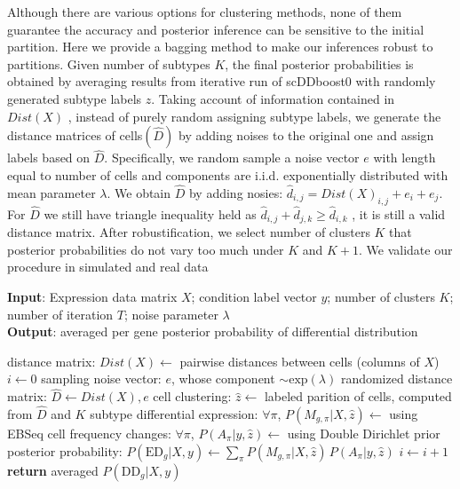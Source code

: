 \documentclass[11pt]{amsart}
\begin{document}
Although there are various options for clustering methods, none of them guarantee the accuracy and posterior inference can be sensitive to the initial partition. Here we provide a bagging method to make our inferences robust to partitions. Given number of subtypes $K$, the final posterior probabilities is obtained by averaging results from iterative run of scDDboost0 with randomly generated subtype labels $\hat z$. Taking account of information contained in $Dist(X)$ , instead of purely random assigning subtype labels, we generate the distance matrices of cells$(\hat D)$ by adding noises to the original one and assign labels based on $\hat D$. Specifically,  we random sample a noise vector $e$ with length equal to number of cells and components are i.i.d. exponentially distributed with mean parameter $\lambda$. We obtain $\hat{D}$ by adding nosies: $\hat{d}_{i,j} = Dist(X)_{i,j} + e_i  + e_j$. For $\hat{D}$ we still have triangle inequality held as $\hat{d}_{i,j} + \hat{d}_{j,k} \geq \hat{d}_{i,k}$ , it is still a valid distance matrix.
After robustification, we select number of clusters $K$ that posterior probabilities do not vary too much under $K$ and $K+1$.  We validate our procedure in simulated and real data


\begin{algorithm}
\caption{}\label{alg:scDDboost-robust}
\raggedright\hspace*{\algorithmicindent} \textbf{Input}: Expression data matrix $X$; condition label vector $y$; number of clusters $K$; number of iteration $T$; noise parameter $\lambda$   
\\
\hspace*{\algorithmicindent} \textbf{Output}: averaged per gene posterior probability of differential distribution 
\begin{algorithmic}[2]
\State distance matrix: $Dist(X) \gets$ pairwise distances between cells (columns of $X$)
\State $i \gets 0$
\State sampling noise vector: $e$, whose component $\sim \text{exp}(\lambda)$
\State randomized distance matrix: $\hat D \gets Dist(X), e$ 
\State cell clustering: $\hat z \gets$ labeled parition of cells, computed from $\hat D$ and $K$
\State subtype differential expression: $\forall \pi$,  $P(M_{g,\pi} | X, \hat z)\gets$ using EBSeq\cite{ref:Leng}
\State cell frequency changes: $\forall \pi$, $P(A_\pi | y, \hat z)\gets$ using Double Dirichlet prior
\State posterior probability: $P(\text{ED}_g | X, y)\gets \underset{\pi}{\sum}P(M_{g,\pi} | X, \hat z) \,
 P(A_\pi | y, \hat z)$
\State $i\gets i + 1$
\EndWhile
\State \textbf{return} averaged $P(\text{DD}_g |X, y)$
\EndProcedure
\end{algorithmic}
\end{algorithm}
\end{document}
